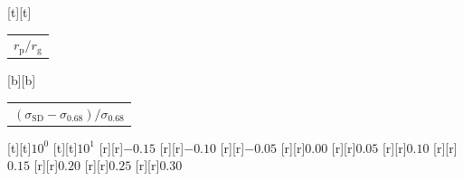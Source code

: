 %    
%
%
\begin{psfrags}%
\psfragscanon%
%
[t][t]{\color[rgb]{0,0,0}\setlength{\tabcolsep}{0pt}\begin{tabular}{c}{\Large$r_\mathrm{p}/r_\mathrm{g}$}\end{tabular}}%
[b][b]{\color[rgb]{0,0,0}\setlength{\tabcolsep}{0pt}\begin{tabular}{c}{\Large$(\sigma_\mathrm{SD}-\sigma_{0.68})/\sigma_{0.68}$}\end{tabular}}%
%
[t][t]{$10^{0}$}%
[t][t]{$10^{1}$}%
%
[r][r]{$-0.15$}%
[r][r]{$-0.10$}%
[r][r]{$-0.05$}%
[r][r]{$0.00$}%
[r][r]{$0.05$}%
[r][r]{$0.10$}%
[r][r]{$0.15$}%
[r][r]{$0.20$}%
[r][r]{$0.25$}%
[r][r]{$0.30$}%
%
%
\end{psfrags}%
%
